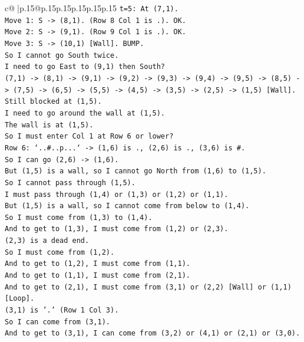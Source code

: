 \documentclass{article}
\begin{document}
{\begin{supertabular}{c@{$\;$}|p{.15\linewidth}@{}p{.15\linewidth}p{.15\linewidth}p{.15\linewidth}p{.15\linewidth}p{.15\linewidth}}
{{{\texttt{t=5: At (7,1).} \\
\texttt{Move 1: S {-}> (8,1). (Row 8 Col 1 is .). OK.} \\
\texttt{Move 2: S {-}> (9,1). (Row 9 Col 1 is .). OK.} \\
\texttt{Move 3: S {-}> (10,1) {[}Wall{]}. BUMP.} \\
\texttt{So I cannot go South twice.} \\
\texttt{I need to go East to (9,1) then South?} \\
\texttt{(7,1) {-}> (8,1) {-}> (9,1) {-}> (9,2) {-}> (9,3) {-}> (9,4) {-}> (9,5) {-}> (8,5) {-}> (7,5) {-}> (6,5) {-}> (5,5) {-}> (4,5) {-}> (3,5) {-}> (2,5) {-}> (1,5) {[}Wall{]}.} \\
\texttt{Still blocked at (1,5).} \\
\texttt{I need to go around the wall at (1,5).} \\
\texttt{The wall is at (1,5).} \\
\texttt{So I must enter Col 1 at Row 6 or lower?} \\
\texttt{Row 6: `..\#..p...` {-}> (1,6) is ., (2,6) is ., (3,6) is \#.} \\
\texttt{So I can go (2,6) {-}> (1,6).} \\
\texttt{But (1,5) is a wall, so I cannot go North from (1,6) to (1,5).} \\
\texttt{So I cannot pass through (1,5).} \\
\texttt{I must pass through (1,4) or (1,3) or (1,2) or (1,1).} \\
\texttt{But (1,5) is a wall, so I cannot come from below to (1,4).} \\
\texttt{So I must come from (1,3) to (1,4).} \\
\texttt{And to get to (1,3), I must come from (1,2) or (2,3).} \\
\texttt{(2,3) is a dead end.} \\
\texttt{So I must come from (1,2).} \\
\texttt{And to get to (1,2), I must come from (1,1).} \\
\texttt{And to get to (1,1), I must come from (2,1).} \\
\texttt{And to get to (2,1), I must come from (3,1) or (2,2) {[}Wall{]} or (1,1) {[}Loop{]}.} \\
\texttt{(3,1) is '.' (Row 1 Col 3).} \\
\texttt{So I can come from (3,1).} \\
\texttt{And to get to (3,1), I can come from (3,2) or (4,1) or (2,1) or (3,0).} \\
}}}
\end{supertabular}}
\end{document}
